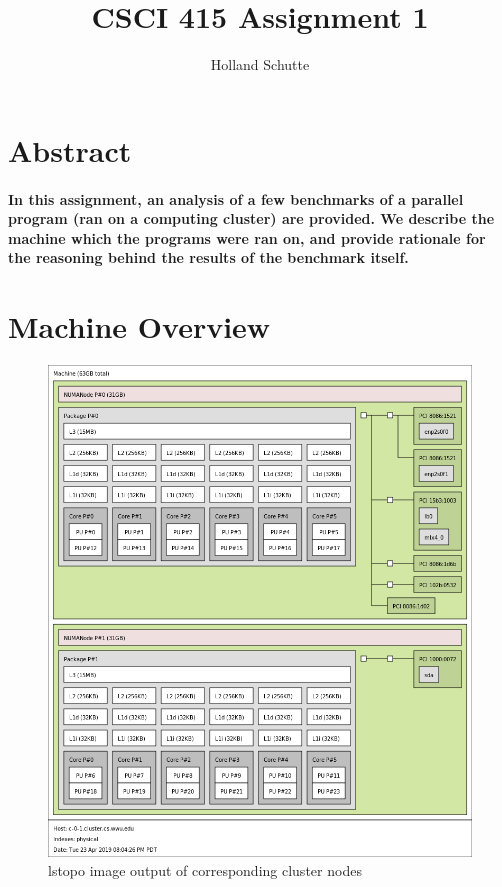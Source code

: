 \documentclass[8pt, a4paper, twoside, twoclumn, english]{extreport}
\begin{document}
\title{CSCI 415 Assignment 1}
\author{Holland Schutte}
\maketitle

\section {Abstract}

\paragraph{
In this assignment, an analysis of a few benchmarks of a parallel program (ran on a computing cluster) are provided.
We describe the machine which the programs were ran on, and provide rationale for the reasoning behind the results
of the benchmark itself.}

\section {Machine Overview}

\begin{figure}[h]
\caption{lstopo image output of corresponding cluster nodes}
\centering
\includegraphics[width=\textwidth]{cluster}
\end{figure}
\end{document}
